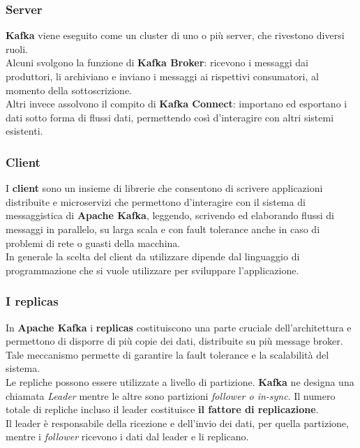 \subsubsection{Server}
\textbf{Kafka} viene eseguito come un cluster di uno o più server, che rivestono diversi ruoli. \\Alcuni svolgono la funzione di \textbf{Kafka Broker}: ricevono i messaggi dai produttori, li archiviano e inviano i messaggi ai rispettivi consumatori, al momento della sottoscrizione.
\\ Altri invece assolvono il compito di \textbf{Kafka Connect}: importano ed esportano i
dati sotto forma di flussi dati, permettendo così  d'interagire con altri sistemi esistenti.
\subsubsection{Client}
I \textbf{client} sono un insieme di librerie che consentono di scrivere applicazioni distribuite e microservizi che permettono d'interagire con
il sistema di messaggistica di \textbf{Apache Kafka}, leggendo, scrivendo ed elaborando flussi di messaggi in parallelo, su larga scala e con \gls{fault tolerance}{} anche in caso di
problemi di rete o guasti della macchina.\\
In generale la scelta del client da utilizzare dipende dal linguaggio di programmazione che si vuole utilizzare per sviluppare l'applicazione.
\subsubsection{I replicas}
In \textbf{Apache Kafka} i \textbf{replicas} costituiscono una parte cruciale dell'architettura e permettono di disporre  di più copie dei dati, distribuite su
più \gls{message broker}{}. Tale meccanismo permette di garantire la \gls{fault tolerance}{} e la scalabilità del sistema.\\
Le repliche possono essere utilizzate a livello di partizione. \textbf{Kafka} ne designa una chiamata \textit{Leader}
mentre le altre sono partizioni \textit{follower o in-sync}. Il numero totale di repliche incluso il
leader costituisce \textbf{il fattore di replicazione}. \\
Il leader è responsabile della ricezione e dell’invio
dei dati, per quella partizione, mentre i \textit{follower} ricevono i dati dal leader e li replicano.\\
